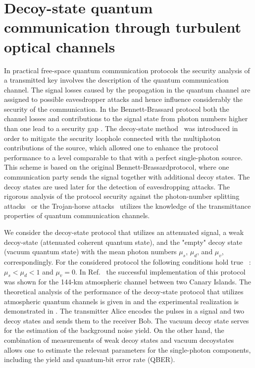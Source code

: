 \documentclass[aps,pra,twocolumn,a4paper,nofootinbib,preprintnumbers] {revtex4-1}
\begin{document}
\section{Decoy-state quantum communication through turbulent optical channels}\label{sec:decoy}

      In practical free-space quantum communication protocols the security analysis  of a transmitted key involves the description of the quantum communication channel.
      The signal losses caused by the propagation in the quantum channel are assigned to possible eavesdropper attacks and hence influence considerably  the security of the communication.
      In the Bennett-Brassard protocol  \cite{Bennett} both the channel losses and   contributions to the signal state from photon numbers higher than one lead to a security gap \cite{Huttner}.
      The decoy-state method~\cite{Hwang, Lo} was introduced in order to mitigate the security loophole connected with the multiphoton contributions of the source, which allowed one to enhance the protocol performance to a level comparable to that  with a perfect single-photon source.
      This scheme is based on the original Bennett-Brassardprotocol, where one communication party  sends the signal together with additional decoy states.
      The decoy states  are  used later for the detection of eavesdropping attacks.
      The rigorous analysis of the protocol security against the photon-number splitting attacks~ \cite{Ma, Skarani} or the Trojan-horse attacks~\cite{Tamaki} utilizes the knowledge of the transmittance properties of quantum communication channels.

      We consider the decoy-state protocol that utilizes an attenuated signal, a weak decoy-state (attenuated coherent quantum state), and the "empty" decoy state (vacuum quantum state) with the mean photon numbers $\mu_s$, $\mu_d$, and $\mu_v$, correspondingly.
      For the considered protocol the following conditions hold true ~\cite{Ma}:  $\mu_s{<}\mu_d{<}1$ and $\mu_v{=}0$.
      In Ref.~\cite{Manderbach} the successful implementation of this protocol was shown for the 144-km atmospheric channel between two Canary Islands.
      The theoretical analysis of the performance of the decoy-state protocol  that utilizes atmospheric quantum channels is given in \cite{Scott, Gruneisen, Lo2018} and the experimental realization is demonstrated in \cite{Liao2018}.
      The transmitter Alice encodes the pulses in a signal and two decoy states and sends them to the receiver Bob.
      The vacuum decoy state serves for the estimation of the  background noise yield.
      On the other hand, the combination of measurements of weak decoy states and vacuum decoystates  allows one to estimate the relevant parameters  for the single-photon components, including the yield and quantum-bit error rate (QBER).
\end{document}
